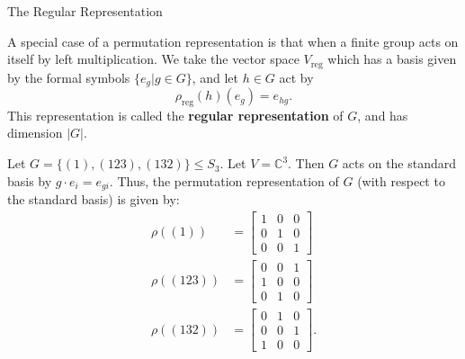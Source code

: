\begin{frame}{The Regular Representation}
\begin{example}
A special case of a permutation representation is that when a finite group acts on itself by left multiplication. We take the vector space $V_{\text{reg}}$ which has a basis given by the formal symbols $\{ e_g | g \in G \}$, and let $h \in G$ act by \[\rho_{\text{reg}}(h) (e_g) = e_{hg}.\]  This representation is called the \textbf{regular representation} of $G$, and has dimension $|G|$.  
 \end{example}
\end{frame}

\begin{frame}
\begin{example}
Let $G = \{ (1), (123), (132) \} \leq S_3$.  Let $V= \mathbb{C}^3$.  Then $G$ acts on the standard basis by $g \cdot e_i = e_ {gi}$.  Thus, the permutation representation of $G$ (with respect to the standard basis) is given by:
\begin{align*}
\rho((1)) &= \begin{bmatrix} 1 & 0 & 0 \\ 0 & 1 & 0 \\ 0 & 0 & 1 \end{bmatrix} \\
\rho((123)) &= \begin{bmatrix} 0 & 0 & 1 \\ 1 & 0 & 0 \\ 0 & 1 & 0 \end{bmatrix} \\
\rho((132)) &= \begin{bmatrix} 0 & 1  & 0 \\ 0 & 0 & 1 \\ 1 & 0 & 0 \end{bmatrix}.
\end{align*}
\end{example}
\end{frame}

